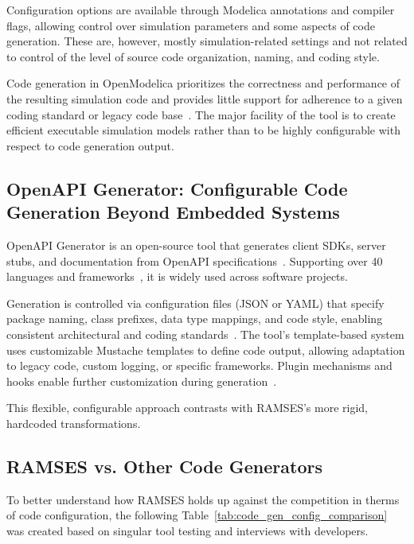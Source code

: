 Configuration options are available through Modelica annotations and compiler flags, allowing control over simulation parameters and some aspects of code generation. These are, however, mostly simulation-related settings and not related to control of the level of source code organization, naming, and coding style.

Code generation in OpenModelica prioritizes the correctness and performance of the resulting simulation code and provides little support for adherence to a given coding standard or legacy code base~\cite{openmodelica-performance}. The major facility of the tool is to create efficient executable simulation models rather than to be highly configurable with respect to code generation output.


\subsection*{OpenAPI Generator: Configurable Code Generation Beyond Embedded Systems}

OpenAPI Generator is an open-source tool that generates client SDKs, server stubs, and documentation from OpenAPI specifications~\cite{OpenAPITools}. Supporting over 40 languages and frameworks~\cite{openapi-generators}, it is widely used across software projects.

Generation is controlled via configuration files (JSON or \gls{YAML}) that specify package naming, class prefixes, data type mappings, and code style, enabling consistent architectural and coding standards~\cite{openapi-config}. The tool’s template-based system uses customizable Mustache templates to define code output, allowing adaptation to legacy code, custom logging, or specific frameworks. Plugin mechanisms and hooks enable further customization during generation~\cite{openapi-customization,openapi-plugins}.

This flexible, configurable approach contrasts with RAMSES’s more rigid, hardcoded transformations.


\subsection*{RAMSES vs. Other Code Generators}

To better understand how RAMSES holds up against the competition in therms of code configuration, the following Table~\ref{tab:code_gen_config_comparison} was created based on singular tool testing and interviews with developers.

